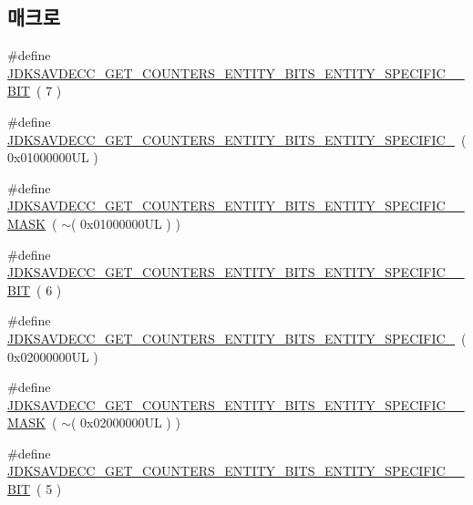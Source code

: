 \subsection*{매크로}
\begin{DoxyCompactItemize}
\item 
\#define \hyperlink{group__get__counters__entity__bits_gaba6a78de69c812112a85f25bdcd2271f}{J\+D\+K\+S\+A\+V\+D\+E\+C\+C\+\_\+\+G\+E\+T\+\_\+\+C\+O\+U\+N\+T\+E\+R\+S\+\_\+\+E\+N\+T\+I\+T\+Y\+\_\+\+B\+I\+T\+S\+\_\+\+E\+N\+T\+I\+T\+Y\+\_\+\+S\+P\+E\+C\+I\+F\+I\+C\+\_\+\_\+\+B\+IT}~( 7 )
\item 
\#define \hyperlink{group__get__counters__entity__bits_ga6753e2c4fd4199de402de12c72b5d383}{J\+D\+K\+S\+A\+V\+D\+E\+C\+C\+\_\+\+G\+E\+T\+\_\+\+C\+O\+U\+N\+T\+E\+R\+S\+\_\+\+E\+N\+T\+I\+T\+Y\+\_\+\+B\+I\+T\+S\+\_\+\+E\+N\+T\+I\+T\+Y\+\_\+\+S\+P\+E\+C\+I\+F\+I\+C\+\_}~( 0x01000000\+U\+L )
\item 
\#define \hyperlink{group__get__counters__entity__bits_ga649324a1b11e43040f95a6459654c02a}{J\+D\+K\+S\+A\+V\+D\+E\+C\+C\+\_\+\+G\+E\+T\+\_\+\+C\+O\+U\+N\+T\+E\+R\+S\+\_\+\+E\+N\+T\+I\+T\+Y\+\_\+\+B\+I\+T\+S\+\_\+\+E\+N\+T\+I\+T\+Y\+\_\+\+S\+P\+E\+C\+I\+F\+I\+C\+\_\+\_\+\+M\+A\+SK}~( $\sim$( 0x01000000\+U\+L ) )
\item 
\#define \hyperlink{group__get__counters__entity__bits_ga4dbf381feb4d14be4660dc8969b1ff20}{J\+D\+K\+S\+A\+V\+D\+E\+C\+C\+\_\+\+G\+E\+T\+\_\+\+C\+O\+U\+N\+T\+E\+R\+S\+\_\+\+E\+N\+T\+I\+T\+Y\+\_\+\+B\+I\+T\+S\+\_\+\+E\+N\+T\+I\+T\+Y\+\_\+\+S\+P\+E\+C\+I\+F\+I\+C\+\_\+\_\+\+B\+IT}~( 6 )
\item 
\#define \hyperlink{group__get__counters__entity__bits_ga80b7d05035af61f599935d8ffcab4df2}{J\+D\+K\+S\+A\+V\+D\+E\+C\+C\+\_\+\+G\+E\+T\+\_\+\+C\+O\+U\+N\+T\+E\+R\+S\+\_\+\+E\+N\+T\+I\+T\+Y\+\_\+\+B\+I\+T\+S\+\_\+\+E\+N\+T\+I\+T\+Y\+\_\+\+S\+P\+E\+C\+I\+F\+I\+C\+\_}~( 0x02000000\+U\+L )
\item 
\#define \hyperlink{group__get__counters__entity__bits_gadeb3fe9573b064a5166c75fd582b3054}{J\+D\+K\+S\+A\+V\+D\+E\+C\+C\+\_\+\+G\+E\+T\+\_\+\+C\+O\+U\+N\+T\+E\+R\+S\+\_\+\+E\+N\+T\+I\+T\+Y\+\_\+\+B\+I\+T\+S\+\_\+\+E\+N\+T\+I\+T\+Y\+\_\+\+S\+P\+E\+C\+I\+F\+I\+C\+\_\+\_\+\+M\+A\+SK}~( $\sim$( 0x02000000\+U\+L ) )
\item 
\#define \hyperlink{group__get__counters__entity__bits_gafdf64987257d977c0fbc5a4ec04d1988}{J\+D\+K\+S\+A\+V\+D\+E\+C\+C\+\_\+\+G\+E\+T\+\_\+\+C\+O\+U\+N\+T\+E\+R\+S\+\_\+\+E\+N\+T\+I\+T\+Y\+\_\+\+B\+I\+T\+S\+\_\+\+E\+N\+T\+I\+T\+Y\+\_\+\+S\+P\+E\+C\+I\+F\+I\+C\+\_\+\_\+\+B\+IT}~( 5 )

\end{DoxyCompactItemize}
